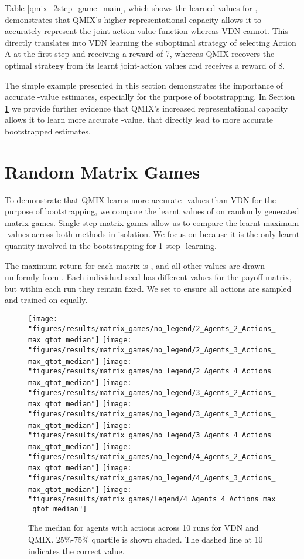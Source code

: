 \documentclass[twoside,11pt]{article}
\begin{document}
Table \ref{qmix_2step_game_main}, which shows the learned values for , demonstrates that QMIX's higher representational capacity allows it to accurately represent the joint-action value function whereas VDN cannot. This directly translates into VDN learning the suboptimal strategy of selecting Action A at the first step and receiving a reward of 7, whereas QMIX recovers the optimal strategy from its learnt joint-action values and receives a reward of 8. 

The simple example presented in this section demonstrates the importance of accurate -value estimates, especially for the purpose of bootstrapping.
In Section \ref{sec:rnd_matrix} we provide further evidence that QMIX's increased representational capacity allows it to learn more accurate -value, that directly lead to more accurate bootstrapped estimates.


 \section{Random Matrix Games}
\label{sec:rnd_matrix}

To demonstrate that QMIX learns more accurate -values than VDN for the purpose of bootstrapping, we compare 
the learnt values of 
on randomly generated matrix games.
Single-step matrix games allow us to compare the learnt maximum -values across both methods in isolation.
We focus on  because it is the only learnt quantity involved in the bootstrapping for 1-step -learning.

The maximum return for each matrix is , and all other values are drawn uniformly from .
Each individual seed has different values for the payoff matrix, but within each run they remain fixed.
We set  to ensure all actions are sampled and trained on equally.

\begin{figure*}[h!]
	\centering
	\texttt{[image: "figures/results/matrix\_games/no\_legend/2\_Agents\_2\_Actions\_max\_qtot\_median"]}
	\texttt{[image: "figures/results/matrix\_games/no\_legend/2\_Agents\_3\_Actions\_max\_qtot\_median"]}
	\texttt{[image: "figures/results/matrix\_games/no\_legend/2\_Agents\_4\_Actions\_max\_qtot\_median"]}
	\texttt{[image: "figures/results/matrix\_games/no\_legend/3\_Agents\_2\_Actions\_max\_qtot\_median"]}
	\texttt{[image: "figures/results/matrix\_games/no\_legend/3\_Agents\_3\_Actions\_max\_qtot\_median"]}
	\texttt{[image: "figures/results/matrix\_games/no\_legend/3\_Agents\_4\_Actions\_max\_qtot\_median"]}
	\texttt{[image: "figures/results/matrix\_games/no\_legend/4\_Agents\_2\_Actions\_max\_qtot\_median"]}
	\texttt{[image: "figures/results/matrix\_games/no\_legend/4\_Agents\_3\_Actions\_max\_qtot\_median"]}
	\texttt{[image: "figures/results/matrix\_games/legend/4\_Agents\_4\_Actions\_max\_qtot\_median"]}
	\caption{The median  for  agents with  actions across 10 runs for VDN and QMIX. 25\%-75\% quartile is shown shaded. The dashed line at 10 indicates the correct value.}
	\label{fig:rnd_matrix}
\end{figure*}
\end{document}
